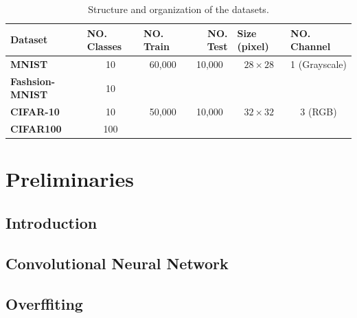 \begin{table}[]
  \label{dataset_table}
  \begin{tabular}{
      l |
      c
      c
      c
      c
      c}
    \hline
    {\textbf{Dataset}}        & \multicolumn{1}{l}{{\textbf{NO. Classes}}} & \multicolumn{1}{l}{{\textbf{NO. Train}}} & \multicolumn{1}{r}{{\textbf{NO. Test}}} & \multicolumn{1}{l}{{\textbf{Size (pixel)}}} & \multicolumn{1}{l}{{\textbf{NO. Channel}}} \\ \hline
    {\textbf{MNIST}}          & 10                                         & 60,000                                   & 10,000                                  & $28\times28$                                & 1 (Grayscale)                              \\
    {\textbf{Fashsion-MNIST}} & 10                                         &                                          &                                         &                                             &                                            \\
    {\textbf{CIFAR-10}}       & 10                                         & 50,000                                   & 10,000                                  & $32\times32$                                & 3 (RGB)                                    \\
    {\textbf{CIFAR100}}       & 100                                        &                                          &                                         &                                             &                                            \\ \hline
  \end{tabular}
  \caption{Structure and organization of the datasets.}
\end{table}


\chapter{Preliminaries}
\section{Introduction}
\section{Convolutional Neural Network}
\section{Overffiting}


